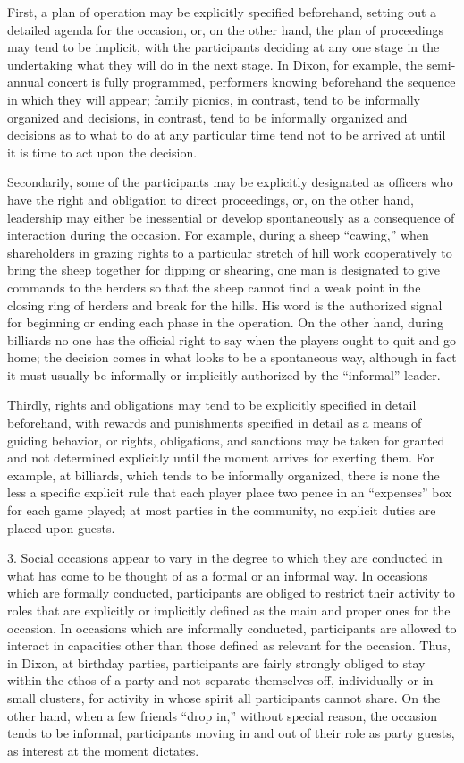 \documentclass[twoside,symmetric,nobib,justified]{tufte-book}
\begin{document}
First, a plan of operation may be explicitly specified beforehand,
setting out a detailed agenda for the occasion, or, on the other hand,
the plan of proceedings may tend to be implicit, with the participants
deciding at any one stage in the undertaking what they will do in the
next stage. In Dixon, for example, the semi-annual concert is fully
programmed, performers knowing beforehand the sequence in which they
will appear; family picnics, in contrast, tend to be informally
organized and decisions, in contrast, tend to be informally organized
and decisions as to what to do at any particular time tend not to be
arrived at until it is time to act upon the decision.

Secondarily, some of the participants may be explicitly designated as
officers who have the right and obligation to direct proceedings, or, on
the other hand, leadership may either be inessential or develop
spontaneously as a consequence of interaction during the occasion. For
example, during a sheep ``cawing,'' when shareholders in grazing rights
to a particular stretch of hill work cooperatively to bring the sheep
together for dipping or shearing, one man is designated to give commands
to the herders so that the sheep cannot find a weak point in the closing
ring of herders and break for the hills. His word is the authorized
signal for beginning or ending each phase in the operation. On the other
hand, during billiards no one has the official right to say when the
players ought to quit and go home; the decision comes in what looks to
be a spontaneous way, although in fact it must usually be informally or
implicitly authorized by the ``informal'' leader.

Thirdly, rights and obligations may tend to be explicitly specified in
detail beforehand, with rewards and punishments specified in detail as a
means of guiding behavior, or rights, obligations, and sanctions may be
taken for granted and not determined explicitly until the moment arrives
for exerting them. For example, at billiards, which tends to be
informally organized, there is none the less a specific explicit rule
that each player place two pence in an ``expenses'' box for each game
played; at most parties in the community, no explicit duties are placed
upon guests.

3. Social occasions appear to vary in the degree to which they are
conducted in what has come to be thought of as a formal or an informal
way. In occasions which are formally conducted, participants are obliged
to restrict their activity to roles that are explicitly or implicitly
defined as the main and proper ones for the occasion. In occasions which
are informally conducted, participants are allowed to interact in
capacities other than those defined as relevant for the occasion. Thus,
in Dixon, at birthday parties, participants are fairly strongly obliged
to stay within the ethos of a party and not separate themselves off,
individually or in small clusters, for activity in whose spirit all
participants cannot share. On the other hand, when a few friends ``drop
in,'' without special reason, the occasion tends to be informal,
participants moving in and out of their role as party guests, as
interest at the moment dictates.
\end{document}
